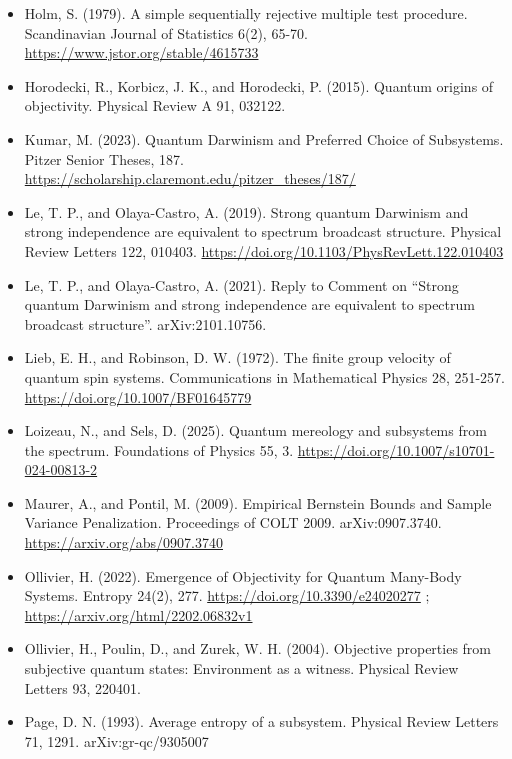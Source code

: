 \documentclass[
  10pt,
  a4paper,
]{article}
\begin{document}
\begin{itemize}
  Hoeffding, W. (1963). Probability inequalities for sums of bounded
  random variables. Journal of the American Statistical Association
  58(301), 13-30. \url{https://doi.org/10.1080/01621459.1963.10500830}
\item
  Holm, S. (1979). A simple sequentially rejective multiple test
  procedure. Scandinavian Journal of Statistics 6(2), 65-70.
  \url{https://www.jstor.org/stable/4615733}
\item
  Horodecki, R., Korbicz, J. K., and Horodecki, P. (2015). Quantum
  origins of objectivity. Physical Review A 91, 032122.
\item
  Kumar, M. (2023). Quantum Darwinism and Preferred Choice of
  Subsystems. Pitzer Senior Theses, 187.
  \url{https://scholarship.claremont.edu/pitzer_theses/187/}
\item
  Le, T. P., and Olaya-Castro, A. (2019). Strong quantum Darwinism and
  strong independence are equivalent to spectrum broadcast structure.
  Physical Review Letters 122, 010403.
  \url{https://doi.org/10.1103/PhysRevLett.122.010403}
\item
  Le, T. P., and Olaya-Castro, A. (2021). Reply to Comment on ``Strong
  quantum Darwinism and strong independence are equivalent to spectrum
  broadcast structure''. arXiv:2101.10756.
\item
  Lieb, E. H., and Robinson, D. W. (1972). The finite group velocity of
  quantum spin systems. Communications in Mathematical Physics 28,
  251-257. \url{https://doi.org/10.1007/BF01645779}
\item
  Loizeau, N., and Sels, D. (2025). Quantum mereology and subsystems
  from the spectrum. Foundations of Physics 55, 3.
  \url{https://doi.org/10.1007/s10701-024-00813-2}
\item
  Maurer, A., and Pontil, M. (2009). Empirical Bernstein Bounds and
  Sample Variance Penalization. Proceedings of COLT 2009.
  arXiv:0907.3740. \url{https://arxiv.org/abs/0907.3740}
\item
  Ollivier, H. (2022). Emergence of Objectivity for Quantum Many-Body
  Systems. Entropy 24(2), 277. \url{https://doi.org/10.3390/e24020277} ;
  \url{https://arxiv.org/html/2202.06832v1}
\item
  Ollivier, H., Poulin, D., and Zurek, W. H. (2004). Objective
  properties from subjective quantum states: Environment as a witness.
  Physical Review Letters 93, 220401.
\item
  Page, D. N. (1993). Average entropy of a subsystem. Physical Review
  Letters 71, 1291. arXiv:gr-qc/9305007

\end{itemize}
\end{document}
